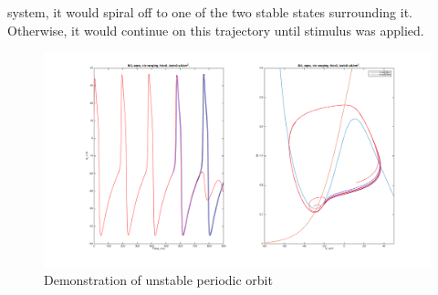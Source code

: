 \documentclass[10pt]{report}
\begin{document}
\begin{enumerate}
system, it would spiral off to one of the two stable states surrounding it. Otherwise, it would continue on this trajectory until stimulus was applied. \begin{figure}[h!] \includegraphics[scale=0.25]{motnq92.png} \caption[h6]{Demonstration of unstable periodic orbit} \end{figure}
%
%

\end{enumerate}
\end{document}
